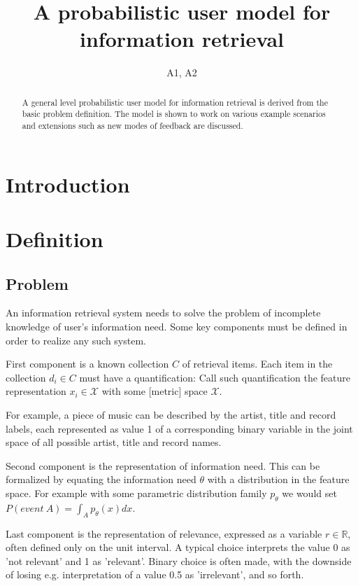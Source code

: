 \documentclass[10pt]{tufte-handout}
\title{A probabilistic user model for information retrieval}
\author{A1, A2}
\date{}
\begin{document}
\maketitle
\begin{abstract}
 A general level probabilistic user model for information retrieval is derived from the basic problem definition. The model is shown to work on various example scenarios and extensions such as new modes of feedback are discussed.
\end{abstract}

\section{Introduction}

\section{Definition}
\subsection{Problem}
An information retrieval system needs to solve the problem of incomplete knowledge of user's information need. Some key components must be defined in order to realize any such system.

First component is a known collection $C$ of retrieval items. Each item in the collection $d_i \in C$ must have a quantification: Call such quantification the feature representation $x_i\in \mathcal X$ with some [metric] space $\mathcal X$. 

For example, a piece of music can be described by the artist, title and record labels, each represented as value 1 of a corresponding binary variable in the joint space of all possible artist, title and record names.

Second component is the representation of information need. This can be formalized by equating the information need $\theta$ with a distribution in the feature space. For example with some parametric distribution family $p_\theta$ we would set $P(event\ A) = \int_A p_\theta (x) dx$.

Last component is the representation of relevance, expressed as a variable $r\in \mathbb R$, often defined only on the unit interval. A typical choice interprets the value 0 as 'not relevant' and 1 as 'relevant'. Binary choice is often made, with the downside of losing e.g. interpretation of a value 0.5 as 'irrelevant', and so forth.
\end{document}
